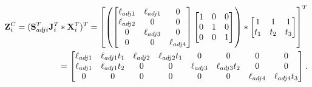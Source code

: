 \documentclass[12pt]{article}
\begin{document}
\begin{align}
{\mathbf Z}^{C}_{i} = ({\mathbf S}^{T}_{adji}{\mathbf J}^{T}_{i} \ast {\mathbf X}^{T}_{i})^{T} =
\left[
\left(
\begin{bmatrix}
\ell_{adj1} & \ell_{adj1}  & 0 \\
\ell_{adj2} &  0  & 0 \\
0  &  \ell_{adj3} & 0 \\
0 & 0 &  \ell_{adj4} 
\end{bmatrix}
\begin{bmatrix}
1 & 0  & 0 \\
0 & 1  & 0 \\
0 & 0  & 1  
\end{bmatrix}
\right)
\ast
\begin{bmatrix}
1   & 1   & 1  \\ 
t_1 & t_2 & t_3
\end{bmatrix} 
\right]^T
\\
= \begin{bmatrix}
\ell_{adj1} & \ell_{adj1}t_1 & \ell_{adj2} & \ell_{adj2}t_1 & 0 & 0 & 0 & 0 \\
\ell_{adj1} & \ell_{adj1}t_2 & 0 & 0 & \ell_{adj3} & \ell_{adj3}t_2 & 0 & 0 \\
0 & 0 & 0 & 0 & 0 & 0 & \ell_{adj4} & \ell_{adj4}t_3
\end{bmatrix}.
\end{align}


% 
% 
\end{document}
